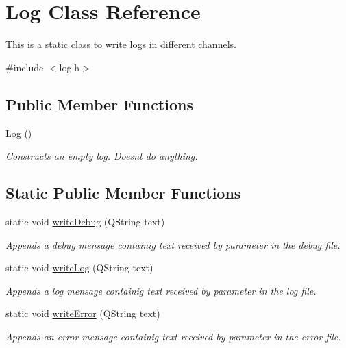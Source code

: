 \hypertarget{classLog}{}\section{Log Class Reference}
\label{classLog}


This is a static class to write logs in different channels.  




{\ttfamily \#include $<$log.\+h$>$}

\subsection*{Public Member Functions}
\begin{DoxyCompactItemize}
\item 
\mbox{\label{classLog_af6071a60aa52b6c1b511f99b4bc1b8fe}} 
\mbox{\hyperlink{classLog_af6071a60aa52b6c1b511f99b4bc1b8fe}{Log}} ()
\begin{DoxyCompactList}\small\item\em Constructs an empty log. Doesn\textquotesingle{}t do anything. \end{DoxyCompactList}\end{DoxyCompactItemize}
\subsection*{Static Public Member Functions}
\begin{DoxyCompactItemize}
\item 
static void \mbox{\hyperlink{classLog_a8291d71e5438b70ac71232a23606690a}{write\+Debug}} (Q\+String text)
\begin{DoxyCompactList}\small\item\em Appends a debug mensage containig text received by parameter in the debug file. \end{DoxyCompactList}\item 
static void \mbox{\hyperlink{classLog_a1808c128874dd41cca3536ed5672df12}{write\+Log}} (Q\+String text)
\begin{DoxyCompactList}\small\item\em Appends a log mensage containig text received by parameter in the log file. \end{DoxyCompactList}\item 
static void \mbox{\hyperlink{classLog_ae35819424f49efa88b29a0bccc962f93}{write\+Error}} (Q\+String text)
\begin{DoxyCompactList}\small\item\em Appends an error mensage containig text received by parameter in the error file. \end{DoxyCompactList}\end{DoxyCompactItemize}


